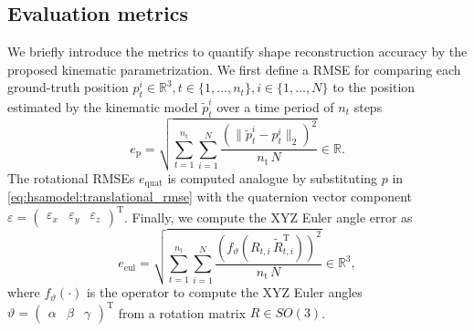 \subsection{Evaluation metrics}\label{sub:hsamodel:kinematics:evaluation_metrics}
We briefly introduce the metrics to quantify shape reconstruction accuracy by the proposed kinematic parametrization. 
We first define a \gls{RMSE} for comparing each ground-truth position $p_t^i \in \mathbb{R}^{3}, t \in \{1,\dots,n_t\}, i \in \{1,\dots,N\}$ to the position estimated by the kinematic model $\tilde{p}_t^i$ over a time period of $n_t$ steps
\begin{equation}\label{eq:hsamodel:translational_rmse}
    e_{\mathrm{p}} = \sqrt{\sum_{t = 1}^{n_\mathrm{t}} \sum_{i = 1}^{N} \frac{\left (\big\lVert \tilde{p}_t^i - p_t^i \big\rVert_2 \right )^2}{n_\mathrm{t} \, N}}  \in \mathbb{R}.
\end{equation}
The rotational \glspl{RMSE} $e_{\mathrm{quat}}$ is computed analogue by substituting $p$ in \eqref{eq:hsamodel:translational_rmse} with the quaternion vector component $\varepsilon = \begin{pmatrix}\varepsilon_x & \varepsilon_y & \varepsilon_z \end{pmatrix}^\mathrm{T}$.
Finally, we compute the XYZ Euler angle error as 
\begin{equation}
    e_\mathrm{eul} = \sqrt{\sum_{t = 1}^{n_\mathrm{t}} \sum_{i = 1}^{N} \frac{\left ( f_\vartheta(R_{t,i} \, \tilde{R}_{t,i}^\mathrm{T}) \right )^2}{n_\mathrm{t} \, N}} \in \mathbb{R}^3,
\end{equation}
where $f_\vartheta(\cdot)$ is the operator to compute the XYZ Euler angles $\vartheta = \begin{pmatrix}\alpha & \beta & \gamma \end{pmatrix}^\mathrm{T}$ from a rotation matrix $R \in SO(3)$.

